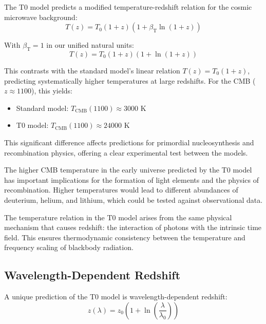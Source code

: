 \documentclass[12pt,a4paper]{article} %
\newcommand{\betaT}{\beta_{\text{T}}}
\begin{document}
	The T0 model predicts a modified temperature-redshift relation
	for the cosmic microwave background:
	\begin{equation}
		T(z) = T_0(1 + z)(1 + \betaT\ln(1 + z))
		\label{eq:temperature_redshift}
	\end{equation}
	
	With $\betaT = 1$ in our unified natural units:
	\begin{equation}
		T(z) = T_0(1 + z)(1 + \ln(1 + z))
		\label{eq:temperature_redshift_simplified}
	\end{equation}
	
	This contrasts with the standard model's linear relation
	$T(z) = T_0(1 + z)$,
	predicting systematically higher temperatures at large redshifts. 
	For the CMB ($z \approx 1100$), this yields:
	\begin{itemize}
		\item Standard model: $T_{\text{CMB}}(1100) \approx 3000$ K
		\item T0 model: $T_{\text{CMB}}(1100) \approx 24000$ K
	\end{itemize}
	
	This significant difference affects predictions
	for primordial nucleosynthesis and recombination physics,
	offering a clear experimental test between the models.
	
	The higher CMB temperature in the early universe
	predicted by the T0 model has important implications
	for the formation of light elements and the physics of recombination. 
	Higher temperatures would lead to different abundances
	of deuterium, helium, and lithium,
	which could be tested against observational data.
	
	The temperature relation in the T0 model
	arises from the same physical mechanism that causes redshift:
	the interaction of photons with the intrinsic time field. 
	This ensures thermodynamic consistency
	between the temperature and frequency scaling of blackbody radiation.
	
	\subsection{Wavelength-Dependent Redshift}
	\label{subsec:wavelength_redshift}
	
	A unique prediction of the T0 model is wavelength-dependent redshift:
	\begin{equation}
		z(\lambda) = z_0\left(1 + \ln\left(\frac{\lambda}{\lambda_0}\right)\right)
		\label{eq:wavelength_redshift}
	\end{equation}
	
\end{document}
